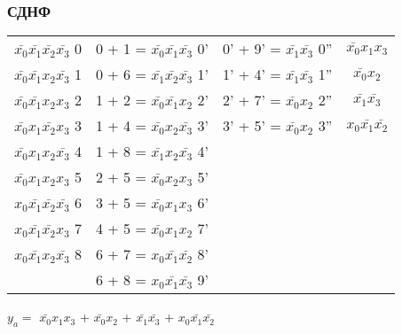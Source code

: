 \documentclass{bmstu}
\begin{document}
	\subsubsection{СДНФ}
	\begin{center}
		\begin{tabular}{ |c|c|c|c| }     
		    \hline
		$\bar{x_0} \bar{x_1} \bar{x_2} \bar{x_3} $  0&0 + 1 = $\bar{x_0} \bar{x_1} \bar{x_3} $  0' &0' + 9' = $\bar{x_1} \bar{x_3} $  0'' &$\bar{x_0} x_1 x_3 $\\
		$\bar{x_0} \bar{x_1} x_2 \bar{x_3} $  1&0 + 6 = $\bar{x_1} \bar{x_2} \bar{x_3} $  1' &1' + 4' = $\bar{x_1} \bar{x_3} $  1'' &$\bar{x_0} x_2 $\\
		$\bar{x_0} \bar{x_1} x_2 x_3 $  2&1 + 2 = $\bar{x_0} \bar{x_1} x_2 $  2' &2' + 7' = $\bar{x_0} x_2 $  2'' &$\bar{x_1} \bar{x_3} $\\
		$\bar{x_0} x_1 \bar{x_2} x_3 $  3&1 + 4 = $\bar{x_0} x_2 \bar{x_3} $  3' &3' + 5' = $\bar{x_0} x_2 $  3'' &$x_0 \bar{x_1} \bar{x_2} $\\
		$\bar{x_0} x_1 x_2 \bar{x_3} $  4&1 + 8 = $\bar{x_1} x_2 \bar{x_3} $  4' & &   \\
		$\bar{x_0} x_1 x_2 x_3 $  5&2 + 5 = $\bar{x_0} x_2 x_3 $  5' & &   \\
		$x_0 \bar{x_1} \bar{x_2} \bar{x_3} $  6&3 + 5 = $\bar{x_0} x_1 x_3 $  6' & &   \\
		$x_0 \bar{x_1} \bar{x_2} x_3 $  7&4 + 5 = $\bar{x_0} x_1 x_2 $  7' & &   \\
		$x_0 \bar{x_1} x_2 \bar{x_3} $  8&6 + 7 = $x_0 \bar{x_1} \bar{x_2} $  8' & &   \\
		&6 + 8 = $x_0 \bar{x_1} \bar{x_3} $  9' & &   \\
			\hline
		\end{tabular}
	\end{center}
	$y_a =$ $\bar{x_0} x_1 x_3 $ + $\bar{x_0} x_2 $ + $\bar{x_1} \bar{x_3} $ + $x_0 \bar{x_1} \bar{x_2} $
\end{document}
